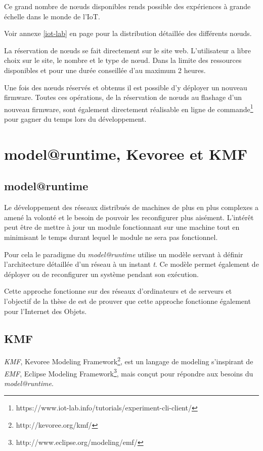 Ce grand nombre de nœuds disponibles rends possible des expériences à grande échelle dans le monde de l'IoT.

Voir annexe \ref{iot-lab} en page \pageref{iot-lab} pour la distribution détaillée des différents nœuds.

La réservation de nœuds se fait directement sur le site web. L'utilisateur a libre choix sur le site, le nombre et le type de nœud. Dans la limite des ressources disponibles et pour une durée conseillée d'au maximum 2 heures.

Une fois des nœuds réservés et obtenus il est possible d'y déployer un nouveau firmware. Toutes ces opérations, de la réservation de nœuds au flashage d'un nouveau firmware, sont également directement réalisable en ligne de commande\footnote{https://www.iot-lab.info/tutorials/experiment-cli-client/} pour gagner du temps lors du développement.

\section{model@runtime, Kevoree et KMF}

\subsection{model@runtime}

Le développement des réseaux distribués de machines de plus en plus complexes a amené la volonté et le besoin de pouvoir les reconfigurer plus aisément. L'intérêt peut être de mettre à jour un module fonctionnant sur une machine tout en minimisant le temps durant lequel le module ne sera pas fonctionnel.

Pour cela le paradigme du \emph{model@runtime} utilise un modèle servant à définir l'architecture détaillée d'un réseau à un instant \emph{t}. Ce modèle permet également de déployer ou de reconfigurer un système pendant son exécution.

Cette approche fonctionne sur des réseaux d'ordinateurs et de serveurs \cite{fouquet} et l'objectif de la thèse de \paco est de prouver que cette approche fonctionne également pour l'Internet des Objets.

\subsection{KMF}

\emph{KMF}, Kevoree Modeling Framework\footnote{http://kevoree.org/kmf/}, est un langage de modeling s'inspirant de \emph{EMF}, Eclipse Modeling Framework\footnote{http://www.eclipse.org/modeling/emf/}, mais conçut pour répondre aux besoins du \emph{model@runtime}.

